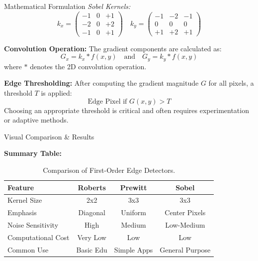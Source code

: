 \documentclass[final]{beamer}
\newlength{\colwidth}
\begin{document}
\begin{frame}[t]
\begin{columns}[t]
\begin{column}{\colwidth}
\begin{block}{Mathematical Formulation}
    \textit{Sobel Kernels:}
    \begin{equation*}
    k_x = \begin{pmatrix} -1 & 0 & +1 \\ -2 & 0 & +2 \\ -1 & 0 & +1 \end{pmatrix} \quad
    k_y = \begin{pmatrix} -1 & -2 & -1 \\ 0 & 0 & 0 \\ +1 & +2 & +1 \end{pmatrix}
    \end{equation*}

    \textbf{Convolution Operation:}
    The gradient components are calculated as:
    \begin{equation*}
    G_x = k_x * f(x, y) \quad \text{and} \quad G_y = k_y * f(x, y)
    \end{equation*}
    where $*$ denotes the 2D convolution operation.

    \textbf{Edge Thresholding:}
    After computing the gradient magnitude $G$ for all pixels, a threshold $T$ is applied:
    \begin{equation*}
    \text{Edge Pixel if } G(x, y) > T
    \end{equation*}
    Choosing an appropriate threshold is critical and often requires experimentation or adaptive methods.

  \end{block}

  \begin{block}{Visual Comparison \& Results}

   \textbf{Summary Table:}
    \begin{table}[h!]
    \centering \small
    \begin{tabular}{lccc}
      \toprule
      \textbf{Feature} & \textbf{Roberts} & \textbf{Prewitt} & \textbf{Sobel} \\
      \midrule
      Kernel Size      & 2x2       & 3x3       & 3x3 \\
      Emphasis         & Diagonal  & Uniform   & Center Pixels \\
      Noise Sensitivity& High      & Medium    & Low-Medium \\
      Computational Cost& Very Low  & Low       & Low \\
      Common Use       & Basic Edu & Simple Apps & General Purpose \\
      \bottomrule
    \end{tabular}
    \caption{Comparison of First-Order Edge Detectors.}
    \label{tab:comparison}
    \end{table}
  \end{block}
  

\end{column}
\end{columns}
\end{frame}
\end{document}
